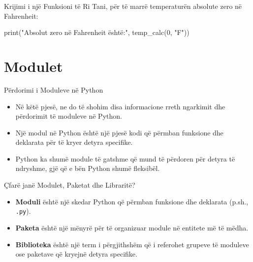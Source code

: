 \documentclass[
  ignorenonframetext,
]{beamer}
\newenvironment{Shaded}{\begin{snugshade}}{\end{snugshade}}
\newcommand{\BuiltInTok}[1]{#1}
\newcommand{\DecValTok}[1]{\textcolor[rgb]{0.00,0.00,0.81}{#1}}
\newcommand{\NormalTok}[1]{#1}
\newcommand{\StringTok}[1]{\textcolor[rgb]{0.31,0.60,0.02}{#1}}
\begin{document}
\begin{frame}[fragile]{Krijimi i një Funksioni të Ri}
\protect\hypertarget{krijimi-i-njuxeb-funksioni-tuxeb-ri-3}{}
Tani, për të marrë temperaturën absolute zero në Fahrenheit:

\begin{Shaded}
\begin{Highlighting}[]
\BuiltInTok{print}\NormalTok{(}\StringTok{"Absolut zero në Fahrenheit është:"}\NormalTok{, temp\_calc(}\DecValTok{0}\NormalTok{, }\StringTok{"F"}\NormalTok{))}
\end{Highlighting}
\end{Shaded}
\end{frame}

\hypertarget{modulet}{%
\section{Modulet}\label{modulet}}

\begin{frame}{Përdorimi i Moduleve në Python}
\protect\hypertarget{puxebrdorimi-i-moduleve-nuxeb-python}{}
\begin{itemize}
\item
  Në këtë pjesë, ne do të shohim disa informacione rreth ngarkimit dhe
  përdorimit të moduleve në Python.
\item
  Një modul në Python është një pjesë kodi që përmban funksione dhe
  deklarata për të kryer detyra specifike.
\item
  Python ka shumë module të gatshme që mund të përdoren për detyra të
  ndryshme, gjë që e bën Python shumë fleksibël.
\end{itemize}
\end{frame}

\begin{frame}[fragile]{Çfarë janë Modulet, Paketat dhe Libraritë?}
\protect\hypertarget{uxe7faruxeb-januxeb-modulet-paketat-dhe-librarituxeb}{}
\begin{itemize}
\item
  \textbf{Moduli} është një skedar Python që përmban funksione dhe
  deklarata (p.sh., \texttt{.py}).
\item
  \textbf{Paketa} është një mënyrë për të organizuar module në entitete
  më të mëdha.
\item
  \textbf{Biblioteka} është një term i përgjithshëm që i referohet
  grupeve të moduleve ose paketave që kryejnë detyra specifike.
\end{itemize}
\end{frame}
\end{document}
